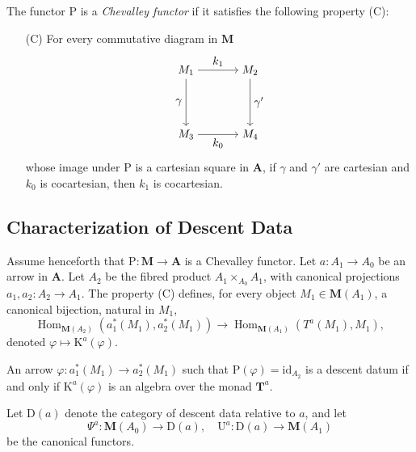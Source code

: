 \documentclass{article}
\begin{document}
\begin{definition}
\label{def:chevalley}
The functor $\mathrm{P}$ is a \emph{Chevalley functor} if it satisfies the following property (C):
\begin{itemize}
    \item[(C)] For every commutative diagram in $\mathbf{M}$
    \[
    \begin{tikzpicture}[baseline=(current bounding box.center)]
        \node (M1) at (0,2) {$M_1$};
        \node (M2) at (2,2) {$M_2$};
        \node (M3) at (0,0) {$M_3$};
        \node (M4) at (2,0) {$M_4$};
        \draw[->] (M1) to node[above] {$k_1$} (M2);
        \draw[->] (M1) to node[left] {$\gamma$} (M3);
        \draw[->] (M2) to node[right] {$\gamma'$} (M4);
        \draw[->] (M3) to node[below] {$k_0$} (M4);
    \end{tikzpicture}
    \]
    whose image under $\mathrm{P}$ is a cartesian square in $\mathbf{A}$, if $\gamma$ and $\gamma'$ are cartesian and $k_0$ is cocartesian, then $k_1$ is cocartesian.
\end{itemize}
\end{definition}

\subsection{Characterization of Descent Data}

Assume henceforth that $\mathrm{P} : \mathbf{M} \to \mathbf{A}$ is a Chevalley functor. Let $a : A_1 \to A_0$ be an arrow in $\mathbf{A}$. Let $A_2$ be the fibred product $A_1 \times_{A_0} A_1$, with canonical projections $a_1, a_2 : A_2 \to A_1$. The property (C) defines, for every object $M_1 \in \mathbf{M}(A_1)$, a canonical bijection, natural in $M_1$,
\[
\operatorname{Hom}_{\mathbf{M}(A_2)}(a_1^*(M_1), a_2^*(M_1)) \to \operatorname{Hom}_{\mathbf{M}(A_1)}(T^a(M_1), M_1),
\]
denoted $\varphi \mapsto \mathrm{K}^a(\varphi)$.

\begin{lemma}
\label{lem:descent}
An arrow $\varphi : a_1^*(M_1) \to a_2^*(M_1)$ such that $\mathrm{P}(\varphi) = \mathrm{id}_{A_2}$ is a descent datum if and only if $\mathrm{K}^a(\varphi)$ is an algebra over the monad $\mathbf{T}^a$.
\end{lemma}

Let $\mathrm{D}(a)$ denote the category of descent data relative to $a$, and let
\[
\Psi^a : \mathbf{M}(A_0) \to \mathrm{D}(a), \quad \mathrm{U}^a : \mathrm{D}(a) \to \mathbf{M}(A_1)
\]
be the canonical functors.
\end{document}
